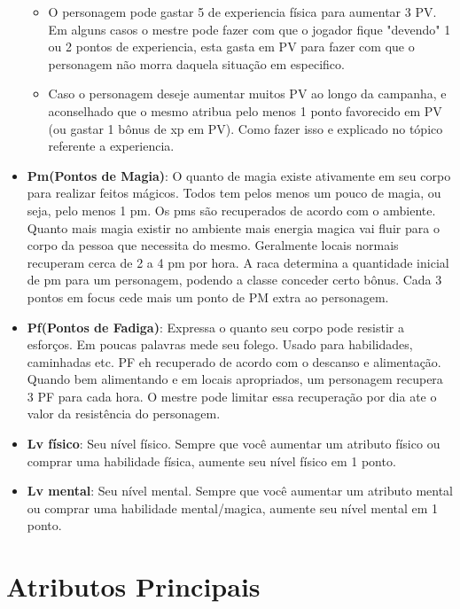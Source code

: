 \begin{itemize}
\begin{itemize}
\item O personagem pode gastar 5 de experiencia física para aumentar 3 PV. Em alguns casos o mestre pode fazer com que o jogador fique "devendo" 1 ou 2 pontos de experiencia, esta gasta em PV para fazer com que o personagem não morra daquela situação em especifico.
\item Caso o personagem deseje aumentar muitos PV ao longo da campanha, e aconselhado que o mesmo atribua pelo menos 1 ponto favorecido em PV (ou gastar 1 bônus de xp em PV). Como fazer isso e explicado no tópico referente a experiencia.
\end{itemize}


\item \textbf{Pm(Pontos de Magia)}: O quanto de magia existe ativamente em seu corpo para realizar feitos mágicos. Todos tem pelos menos um pouco de magia, ou seja, pelo menos 1 pm. Os pms são recuperados de acordo com o ambiente. Quanto mais magia existir no ambiente mais energia magica vai fluir para o corpo da pessoa que necessita do mesmo. Geralmente locais normais recuperam cerca de 2 a 4 pm por hora. 
A raca determina a quantidade inicial de pm para um personagem, podendo a classe conceder certo bônus. Cada 3 pontos em focus cede mais um ponto de PM extra ao personagem.

\item \textbf{Pf(Pontos de Fadiga)}: Expressa o quanto seu corpo pode resistir a esforços. Em poucas palavras mede seu folego. Usado para habilidades, caminhadas etc. PF eh recuperado de acordo com o descanso e alimentação. Quando bem alimentando e em locais apropriados, um personagem recupera 3 PF para cada hora. O mestre pode limitar essa recuperação por dia ate o valor da resistência do personagem.

\item \textbf{Lv físico}: Seu nível físico. Sempre que você aumentar um atributo físico ou comprar uma habilidade física, aumente seu nível físico em 1 ponto.
\item \textbf{Lv mental}: Seu nível mental. Sempre que você aumentar um atributo mental ou comprar uma habilidade mental/magica, aumente seu nível mental em 1 ponto.

\end{itemize}

\section{Atributos Principais}

